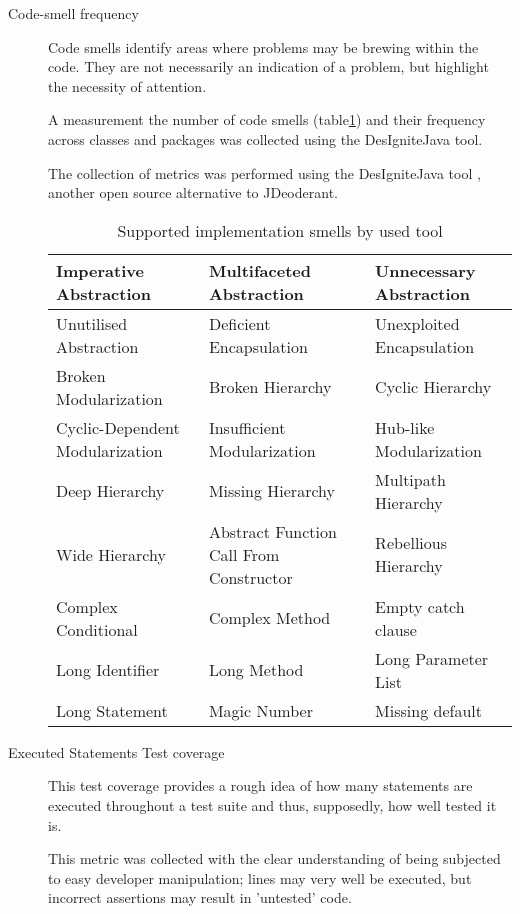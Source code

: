 \begin{description}
	\item [Code-smell frequency] Code smells identify areas where problems may be brewing within the code. They are not necessarily an indication of a problem, but highlight the necessity of attention. \parencite[chapter~3]{fowler1999refactoring}
	
	A measurement the number of code smells (table\ref{tab:supportedCodeSmells}) and their frequency across classes and packages was collected using the DesIgniteJava tool.
	
	The collection of metrics was performed using the DesIgniteJava tool \parencite{designiteToolGitHub}, another open source alternative to JDeoderant.
	
	\begin{table}[H]
		\begin{tabular}{ | l | l | l |}
			\hline
			Imperative Abstraction & Multifaceted Abstraction & Unnecessary Abstraction \\
			\hline
			Unutilised Abstraction & Deficient Encapsulation & Unexploited Encapsulation \\
			\hline
			Broken Modularization & Broken Hierarchy & Cyclic Hierarchy \\
			\hline
			Cyclic-Dependent Modularization & Insufficient Modularization & Hub-like Modularization \\
			\hline
			Deep Hierarchy & Missing Hierarchy & Multipath Hierarchy \\ 
			\hline
			Wide Hierarchy & Abstract Function Call From Constructor & Rebellious Hierarchy \\
			\hline
			Complex Conditional & Complex Method & Empty catch clause \\
			\hline
			Long Identifier & Long Method & Long Parameter List \\
			\hline
			Long Statement & Magic Number & Missing default \\
			\hline
		\end{tabular}
		\caption{Supported implementation smells by used tool}
		\label{tab:supportedCodeSmells}
	\end{table}
	
	\item [Executed Statements Test coverage] This test coverage \parencite{Miller:1963:SMA:366246.366248} provides a rough idea of how many statements are executed throughout a test suite and thus, supposedly, how well tested it is.
	
	This metric was collected with the clear understanding of being subjected to easy developer manipulation; lines may very well be executed, but incorrect assertions may result in 'untested' code.
	

\end{description}
